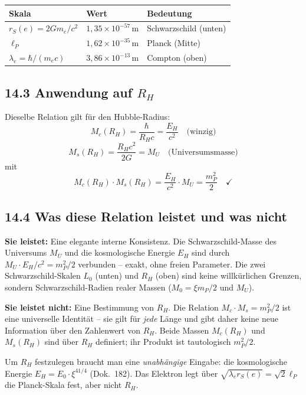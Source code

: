\begin{center}
\begin{tabular}{lll}
\toprule
\textbf{Skala} & \textbf{Wert} & \textbf{Bedeutung} \\
\midrule
$r_S(e) = 2Gm_e/c^2$ & $1{,}35\times10^{-57}$\,m & Schwarzschild (unten) \\
$\ell_P$ & $1{,}62\times10^{-35}$\,m & Planck (Mitte) \\
$\lambda_e = \hbar/(m_e c)$ & $3{,}86\times10^{-13}$\,m & Compton (oben) \\
\bottomrule
\end{tabular}
\end{center}

\subsection*{14.3 Anwendung auf $R_H$}

Dieselbe Relation gilt für den Hubble-Radius:
\[
  M_c(R_H) = \frac{\hbar}{R_H c} = \frac{E_H}{c^2}
  \quad\text{(winzig)}
\]
\[
  M_s(R_H) = \frac{R_H c^2}{2G} = M_U
  \quad\text{(Universumsmasse)}
\]
mit
\[
  M_c(R_H)\cdot M_s(R_H) = \frac{E_H}{c^2}\cdot M_U
  = \frac{m_P^2}{2}
  \quad\checkmark
\]

\subsection*{14.4 Was diese Relation leistet und was nicht}

\textbf{Sie leistet:} Eine elegante interne Konsistenz.
Die Schwarzschild-Masse des Universums $M_U$ und die
kosmologische Energie $E_H$ sind durch $M_U \cdot E_H/c^2 = m_P^2/2$
verbunden -- exakt, ohne freien Parameter. Die zwei Schwarzschild-Skalen
$L_0$ (unten) und $R_H$ (oben) sind keine willkürlichen Grenzen,
sondern Schwarzschild-Radien realer Massen ($M_0 = \xi m_P/2$ und $M_U$).

\textbf{Sie leistet nicht:} Eine Bestimmung von $R_H$.
Die Relation $M_c \cdot M_s = m_P^2/2$ ist eine universelle Identität --
sie gilt für \emph{jede} Länge und gibt daher keine neue Information
über den Zahlenwert von $R_H$. Beide Massen $M_c(R_H)$ und $M_s(R_H)$
sind über $R_H$ definiert; ihr Produkt ist tautologisch $m_P^2/2$.

Um $R_H$ festzulegen braucht man eine \emph{unabhängige} Eingabe:
die kosmologische Energie $E_H = E_0\cdot\xi^{41/4}$ (Dok.~182).
Das Elektron legt über $\sqrt{\lambda_e r_S(e)} = \sqrt{2}\ell_P$
die Planck-Skala fest, aber nicht $R_H$.

